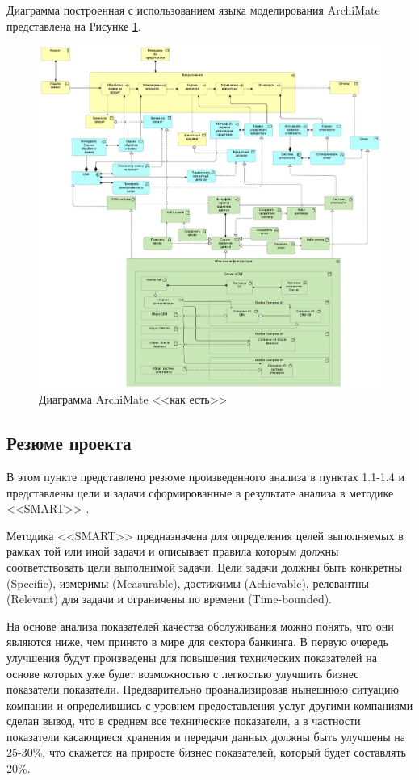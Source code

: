 \documentclass[14pt, a4paper]{extarticle}
\begin{document}
Диаграмма построенная с использованием языка моделирования ArchiMate
представлена на Рисунке \ref{fig:as_is_archimate}.

\begin{figure}[H]
	\centering
	\includegraphics[width=\textwidth]{last_archi_approved.jpg}
	\caption{Диаграмма ArchiMate <<как есть>>}
	\label{fig:as_is_archimate}
\end{figure}

\subsection{Резюме проекта}

В этом пункте представлено резюме произведенного анализа в пунктах 1.1-1.4 и
представлены цели и задачи сформированные в результате анализа в методике
<<SMART>> \cite{smart2.0}.

Методика <<SMART>> предназначена для определения целей выполняемых в рамках
той или иной задачи и описывает правила которым должны соответствовать цели
выполнимой задачи. Цели задачи должны быть конкретны (Specific), измеримы
(Measurable), достижимы (Achievable), релевантны (Relevant) для задачи и
ограничены по времени (Time-bounded).

На основе анализа показателей качества обслуживания можно понять, что они
являются ниже, чем принято в мире для сектора банкинга. В первую очередь
улучшения
будут произведены для повышения технических показателей на основе которых уже
будет возможностью с легкостью улучшить бизнес показатели показатели.
Предварительно проанализировав нынешнюю ситуацию компании и определившись с
уровнем предоставления услуг другими компаниями сделан вывод, что в среднем все
технические показатели, а в частности показатели касающиеся хранения и передачи
данных должны быть улучшены на 25-30\%, что скажется на приросте бизнес
показателей, который будет составлять 20\%.
\end{document}
